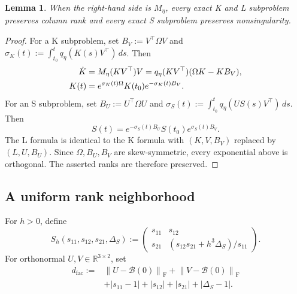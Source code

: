 \documentclass[]{article}
\numberwithin{equation}{section}
\theoremstyle{plain}
\newtheorem{lemma}[theorem]{Lemma}
\theoremstyle{remark}
\newcommand{\F}{\mathrm F}
\newcommand{\norm}[1]{\left\lVert #1\right\rVert}
\begin{document}
\begin{lemma}\label{lem:post-switch-rank}
When the right-hand side is $M_\eta$, every exact K and L subproblem
preserves column rank and every exact S subproblem preserves
nonsingularity.
\end{lemma}

\begin{proof}
For a K subproblem, set
\(B_V:=V^\top\Omega V\) and
\(\sigma_K(t):=\int_{t_0}^tq_\eta(K(s)V^\top)\,ds\).  Then
\begin{align}
 \dot K
 &=M_\eta(KV^\top)V
 =q_\eta(KV^\top)(\Omega K-KB_V),
 \label{eq:post-reduction-k}\\
 K(t)&=e^{\sigma_K(t)\Omega}K(t_0)e^{-\sigma_K(t)B_V}.
 \notag
\end{align}
For an S subproblem, set \(B_U:=U^\top\Omega U\) and
\(\sigma_S(t):=\int_{t_0}^tq_\eta(US(s)V^\top)\,ds\).  Then
\begin{equation}\label{eq:post-reduction-s}
 S(t)=e^{-\sigma_S(t)B_U}S(t_0)e^{\sigma_S(t)B_V}.
\end{equation}
The L formula is identical to the K formula with
\((K,V,B_V)\) replaced by \((L,U,B_U)\).  Since
\(\Omega,B_U,B_V\) are skew-symmetric, every exponential above is
orthogonal.  The asserted ranks are therefore preserved.
\end{proof}

\subsection{A uniform rank neighborhood}
\label{app:uniform-neighborhood}

For \(h>0\), define
\begin{equation}\label{eq:appendix-block-start-chart}
 S_h(s_{11},s_{12},s_{21},\Delta_S):=
 \begin{pmatrix}
 s_{11}&s_{12}\\
 s_{21}&(s_{12}s_{21}+h^3\Delta_S)/s_{11}
 \end{pmatrix}.
\end{equation}
For orthonormal \(U,V\in\mathbb R^{3\times2}\), set
\begin{equation}\label{eq:appendix-fixed-neighborhood}
\begin{aligned}
 d_{\mathrm{fac}}:={}&\norm{U-\mathcal B(0)}_{\F}
 +\norm{V-\mathcal B(0)}_{\F}\\
 &+|s_{11}-1|+|s_{12}|+|s_{21}|+|\Delta_S-1|.
\end{aligned}
\end{equation}
\end{document}
